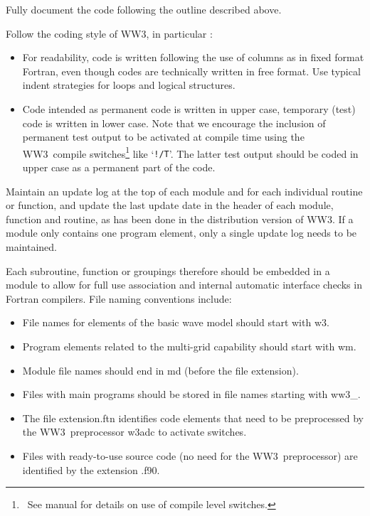 \documentclass[12pt]{article}
\newcommand{\ws}{WW3}
\newcommand{\file}{\sf}
\newcommand{\code}{\tt}
\newcounter{mylistno}
\begin{document}
\begin{list}{)}{ \rightmargin 8mm
                                \leftmargin 10mm }

\item Fully document the code following the outline described above.

\item Follow the coding style of \ws, in particular :

\begin{itemize}
\item For readability, code is written following the use of columns as in
      fixed format Fortran, even though codes are technically written in free
      format. Use typical indent strategies for loops and logical structures.
\item Code intended as permanent code is written in upper case, temporary
      (test) code is written in lower case. Note that we encourage the
      inclusion of permanent test output to be activated at compile time using
      the \ws\ compile switches\footnote{~See manual for details on use of
      compile level switches.} like `{\code !/T}'. The latter test output
      should be coded in upper case as a permanent part of the code.
\end{itemize}

\item Maintain an update log at the top of each module and for each individual
      routine or function, and update the last update date in the header of
      each module, function and routine, as has been done in the distribution
      version of \ws. If a module only contains one program element, only a
      single update log needs to be maintained.

\item Each subroutine, function or groupings therefore should be embedded in a
      module to allow for full use association and internal automatic
      interface checks in Fortran compilers. File naming conventions include:

\begin{itemize}
\item File names for elements of the basic wave model should start with {\file
      w3}.
\item Program elements related to the multi-grid capability should start with
      {\file wm}.
\item Module file names should end in {\file md} (before the file extension).
\item Files with main programs should be stored in file names starting with
      {\file ww3\_}.
\item The file extension{\file .ftn} identifies code elements that need to be
      preprocessed by the \ws\ preprocessor {\file w3adc} to activate
      switches.
\item Files with ready-to-use source code (no need for the \ws\ preprocessor)
      are identified by the extension {\file .f90}.
\end{itemize}


\end{list}
\end{document}

